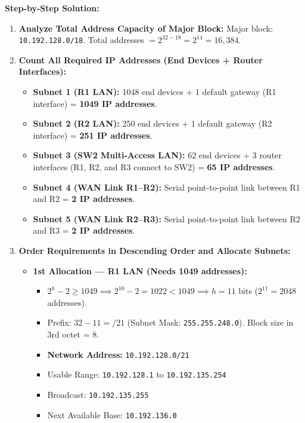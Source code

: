 \documentclass[11pt,a4paper]{article}
\begin{document}
\textbf{Step-by-Step Solution:}
\begin{enumerate}
    \item \textbf{Analyze Total Address Capacity of Major Block:}
    Major block: \texttt{10.192.128.0/18}. Total addresses $= 2^{32-18} = 2^{14} = 16,384$.
    
    \item \textbf{Count All Required IP Addresses (End Devices + Router Interfaces):}
    \begin{itemize}
        \item \textbf{Subnet 1 (R1 LAN):} 1048 end devices + 1 default gateway (R1 interface) = \textbf{1049 IP addresses}.
        \item \textbf{Subnet 2 (R2 LAN):} 250 end devices + 1 default gateway (R2 interface) = \textbf{251 IP addresses}.
        \item \textbf{Subnet 3 (SW2 Multi-Access LAN):} 62 end devices + 3 router interfaces (R1, R2, and R3 connect to SW2) = \textbf{65 IP addresses}.
        \item \textbf{Subnet 4 (WAN Link R1--R2):} Serial point-to-point link between R1 and R2 = \textbf{2 IP addresses}.
        \item \textbf{Subnet 5 (WAN Link R2--R3):} Serial point-to-point link between R2 and R3 = \textbf{2 IP addresses}.
    \end{itemize}

    \item \textbf{Order Requirements in Descending Order and Allocate Subnets:}
    \begin{itemize}
        \item \textbf{1st Allocation --- R1 LAN (Needs 1049 addresses):}
        \begin{itemize}
            \item $2^h - 2 \ge 1049 \implies 2^{10}-2 = 1022 < 1049 \implies h = 11$ bits ($2^{11} = 2048$ addresses).
            \item Prefix: $32 - 11 = /21$ (Subnet Mask: \texttt{255.255.248.0}). Block size in 3rd octet = 8.
            \item \textbf{Network Address:} \texttt{10.192.128.0/21}
            \item Usable Range: \texttt{10.192.128.1} to \texttt{10.192.135.254}
            \item Broadcast: \texttt{10.192.135.255}
            \item Next Available Base: \texttt{10.192.136.0}
        \end{itemize}


\end{itemize}
\end{enumerate}
\end{document}
